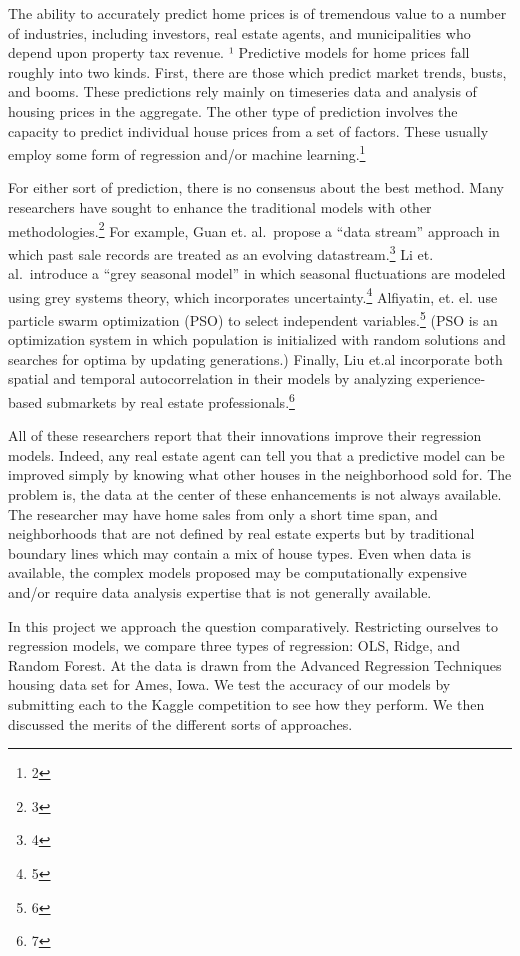 \documentclass[
]{article}
\begin{document}
The ability to accurately predict home prices is of tremendous value to
a number of industries, including investors, real estate agents, and
municipalities who depend upon property tax revenue. ¹ Predictive models
for home prices fall roughly into two kinds. First, there are those
which predict market trends, busts, and booms. These predictions rely
mainly on timeseries data and analysis of housing prices in the
aggregate. The other type of prediction involves the capacity to predict
individual house prices from a set of factors. These usually employ some
form of regression and/or machine learning.\footnote{2}

For either sort of prediction, there is no consensus about the best
method. Many researchers have sought to enhance the traditional models
with other methodologies.\footnote{3} For example, Guan et. al.~propose
a ``data stream'' approach in which past sale records are treated as an
evolving datastream.\footnote{4} Li et. al.~introduce a ``grey seasonal
model'' in which seasonal fluctuations are modeled using grey systems
theory, which incorporates uncertainty.\footnote{5} Alfiyatin, et. el.
use particle swarm optimization (PSO) to select independent
variables.\footnote{6} (PSO is an optimization system in which
population is initialized with random solutions and searches for optima
by updating generations.) Finally, Liu et.al incorporate both spatial
and temporal autocorrelation in their models by analyzing
experience-based submarkets by real estate professionals.\footnote{7}

All of these researchers report that their innovations improve their
regression models. Indeed, any real estate agent can tell you that a
predictive model can be improved simply by knowing what other houses in
the neighborhood sold for. The problem is, the data at the center of
these enhancements is not always available. The researcher may have home
sales from only a short time span, and neighborhoods that are not
defined by real estate experts but by traditional boundary lines which
may contain a mix of house types. Even when data is available, the
complex models proposed may be computationally expensive and/or require
data analysis expertise that is not generally available.

In this project we approach the question comparatively. Restricting
ourselves to regression models, we compare three types of regression:
OLS, Ridge, and Random Forest. At the data is drawn from the Advanced
Regression Techniques housing data set for Ames, Iowa. We test the
accuracy of our models by submitting each to the Kaggle competition to
see how they perform. We then discussed the merits of the different
sorts of approaches.
\end{document}
